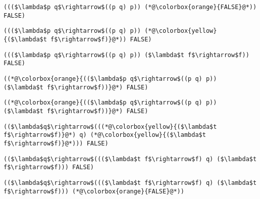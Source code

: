 \documentclass{beamer}
\begin{document}
\begin{frame}[fragile]{\CurrentSection}
\lstset{basicstyle=\ttfamily\small}\lstset{numbers=none}\lstset{language=ML}\begin{lstlisting}
((($\lambda$p q$\rightarrow$((p q) p)) (*@\colorbox{orange}{FALSE}@*)) FALSE)
\end{lstlisting}
\pause\lstset{language=ML}\begin{lstlisting}
((($\lambda$p q$\rightarrow$((p q) p)) (*@\colorbox{yellow}{($\lambda$t f$\rightarrow$f)}@*)) FALSE)
\end{lstlisting}

\end{frame}

\begin{frame}[fragile]{\CurrentSection}
\lstset{basicstyle=\ttfamily\small}\lstset{numbers=none}\lstset{language=ML}\begin{lstlisting}
((($\lambda$p q$\rightarrow$((p q) p)) ($\lambda$t f$\rightarrow$f)) FALSE)
\end{lstlisting}
\pause\lstset{language=ML}\begin{lstlisting}
((*@\colorbox{orange}{(($\lambda$p q$\rightarrow$((p q) p)) ($\lambda$t f$\rightarrow$f))}@*) FALSE)
\end{lstlisting}

\end{frame}

\begin{frame}[fragile]{\CurrentSection}
\lstset{basicstyle=\ttfamily\small}\lstset{numbers=none}\lstset{language=ML}\begin{lstlisting}
((*@\colorbox{orange}{(($\lambda$p q$\rightarrow$((p q) p)) ($\lambda$t f$\rightarrow$f))}@*) FALSE)
\end{lstlisting}
\pause\lstset{language=ML}\begin{lstlisting}
(($\lambda$q$\rightarrow$(((*@\colorbox{yellow}{($\lambda$t f$\rightarrow$f)}@*) q) (*@\colorbox{yellow}{($\lambda$t f$\rightarrow$f)}@*))) FALSE)
\end{lstlisting}

\end{frame}

\begin{frame}[fragile]{\CurrentSection}
\lstset{basicstyle=\ttfamily\small}\lstset{numbers=none}\lstset{language=ML}\begin{lstlisting}
(($\lambda$q$\rightarrow$((($\lambda$t f$\rightarrow$f) q) ($\lambda$t f$\rightarrow$f))) FALSE)
\end{lstlisting}
\pause\lstset{language=ML}\begin{lstlisting}
(($\lambda$q$\rightarrow$((($\lambda$t f$\rightarrow$f) q) ($\lambda$t f$\rightarrow$f))) (*@\colorbox{orange}{FALSE}@*))
\end{lstlisting}

\end{frame}
\end{document}
